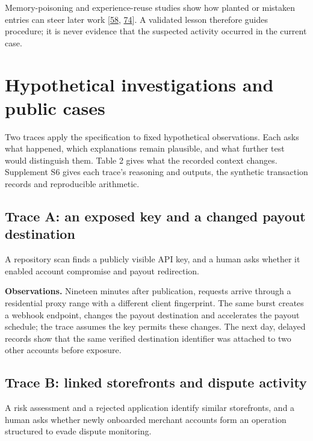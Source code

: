 \documentclass[acmlarge,review,anonymous,nonacm]{acmart}
\begin{document}
Memory-poisoning and experience-reuse studies show how planted or
mistaken entries can steer later work
{[}\protect\hyperlink{ref-Dash2026}{58},
\protect\hyperlink{ref-Xiong2026MemoryManagement}{74}{]}. A validated
lesson therefore guides procedure; it is never evidence that the
suspected activity occurred in the current case.

\hypertarget{hypothetical-investigations-and-public-cases}{%
\section{Hypothetical investigations and public
cases}\label{hypothetical-investigations-and-public-cases}}

Two traces apply the specification to fixed hypothetical observations.
Each asks what happened, which explanations remain plausible, and what
further test would distinguish them. Table 2 gives what the recorded
context changes. Supplement S6 gives each trace's reasoning and outputs,
the synthetic transaction records and reproducible arithmetic.

\hypertarget{trace-a-an-exposed-key-and-a-changed-payout-destination}{%
\subsection{Trace A: an exposed key and a changed payout
destination}\label{trace-a-an-exposed-key-and-a-changed-payout-destination}}

A repository scan finds a publicly visible API key, and a human asks
whether it enabled account compromise and payout redirection.

\textbf{Observations.} Nineteen minutes after publication, requests
arrive through a residential proxy range with a different client
fingerprint. The same burst creates a webhook endpoint, changes the
payout destination and accelerates the payout schedule; the trace
assumes the key permits these changes. The next day, delayed records
show that the same verified destination identifier was attached to two
other accounts before exposure.

\hypertarget{trace-b-linked-storefronts-and-dispute-activity}{%
\subsection{Trace B: linked storefronts and dispute
activity}\label{trace-b-linked-storefronts-and-dispute-activity}}

A risk assessment and a rejected application identify similar
storefronts, and a human asks whether newly onboarded merchant accounts
form an operation structured to evade dispute monitoring.
\end{document}
